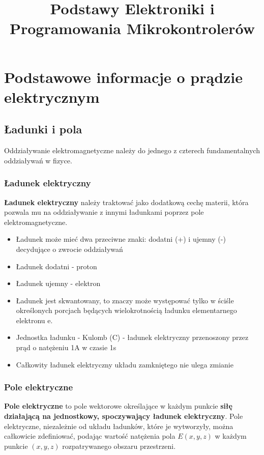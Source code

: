 \documentclass{article}
\title{Podstawy Elektroniki i Programowania Mikrokontrolerów}
\begin{document}
\maketitle

\newpage \tableofcontents

\section{Podstawowe informacje o prądzie
elektrycznym}

\subsection{Ładunki i pola}
Oddziaływanie elektromagnetyczne należy do jednego z czterech fundamentalnych oddziaływań w fizyce. 
\subsubsection{Ładunek elektryczny}
\textbf{Ładunek elektryczny} należy traktować jako dodatkową cechę materii, która pozwala mu na oddziaływanie z innymi ładunkami poprzez pole elektromagnetyczne. 
\begin{itemize}
    \item Ładunek może mieć dwa przeciwne znaki: dodatni (+) i ujemny (-) decydujące o zwrocie oddziaływań
    \item Ładunek dodatni - proton
    \item Ładunek ujemny - elektron
    \item Ładunek jest skwantowany, to znaczy może występować tylko w ściśle określonych porcjach będących wielokrotnością ładunku elementarnego elektronu e.
    \item Jednostka ładunku - Kulomb (C) - ładunek elektryczny przenoszony przez prąd o natężeniu 1A w czasie 1s
    \item Całkowity ładunek elektryczny układu zamkniętego nie ulega zmianie
\end{itemize}

\subsubsection{Pole elektryczne}
\textbf{Pole elektryczne} to pole wektorowe określające w każdym punkcie \textbf{siłę działającą na jednostkowy, spoczywający ładunek elektryczny}. Pole elektryczne, niezależnie od układu ładunków, które je wytworzyły, można całkowicie zdefiniować, podając wartość natężenia pola $E(x, y, z)$ w każdym punkcie $(x, y, z)$ rozpatrywanego obszaru przestrzeni.
\end{document}
